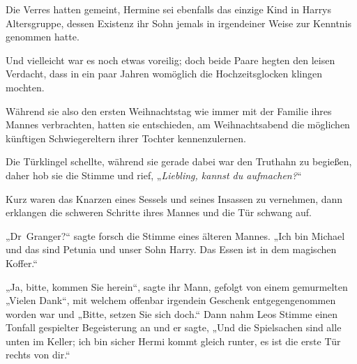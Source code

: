 Die Verres hatten gemeint, Hermine sei ebenfalls das einzige Kind in Harrys Altersgruppe, dessen Existenz ihr Sohn jemals in irgendeiner Weise zur Kenntnis genommen hatte.

Und vielleicht war es noch etwas voreilig; doch beide Paare hegten den leisen Verdacht, dass in ein paar Jahren womöglich die Hochzeitsglocken klingen mochten.

Während sie also den ersten Weihnachtstag wie immer mit der Familie ihres Mannes verbrachten, hatten sie entschieden, am Weihnachtsabend die möglichen künftigen Schwiegereltern ihrer Tochter kennenzulernen.

Die Türklingel schellte, während sie gerade dabei war den Truthahn zu begießen, daher hob sie die Stimme und rief, „\emph{Liebling, kannst du aufmachen?}“

Kurz waren das Knarzen eines Sessels und seines Insassen zu vernehmen, dann erklangen die schweren Schritte ihres Mannes und die Tür schwang auf.

„Dr~Granger?“ sagte forsch die Stimme eines älteren Mannes. „Ich bin Michael und das sind Petunia und unser Sohn Harry. Das Essen ist in dem magischen Koffer.“

„Ja, bitte, kommen Sie herein“, sagte ihr Mann, gefolgt von einem gemurmelten „Vielen Dank“, mit welchem offenbar irgendein Geschenk entgegengenommen worden war und „Bitte, setzen Sie sich doch.“ Dann nahm Leos Stimme einen Tonfall gespielter Begeisterung an und er sagte, „Und die Spielsachen sind alle unten im Keller; ich bin sicher Hermi kommt gleich runter, es ist die erste Tür rechts von dir.“

